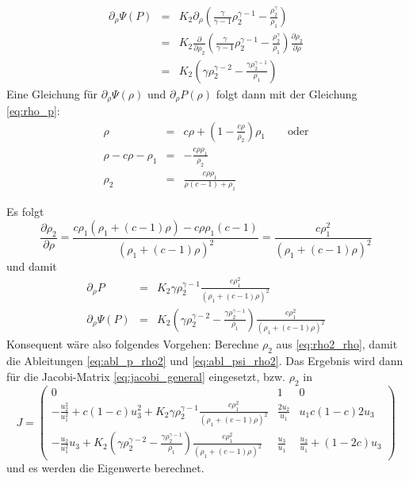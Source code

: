 \begin{eqnarray*}
  \partial_{\rho} \Psi(P) &=& K_2 \partial_{\rho}
\left(\frac{\gamma}{\gamma-1} \rho_2^{\gamma-1} -
\frac{\rho_2^{\gamma}}{\rho_1}\right)\\
 &=& K_2 \frac{\partial}{\partial \rho_2}\left(\frac{\gamma}{\gamma-1}
\rho_2^{\gamma-1} -
\frac{\rho_2^{\gamma}}{\rho_1}\right)\frac{\partial\rho_2}{\partial
  \rho}\\
 &=& K_2 \left(\gamma\rho_2^{\gamma-2} -
\frac{\gamma\rho_2^{\gamma-1}}{\rho_1}\right)
\end{eqnarray*}
Eine Gleichung für $\partial_{\rho} \Psi(\rho)$ und
$\partial_{\rho} P(\rho)$ folgt dann mit der Gleichung \ref{eq:rho_p}:
\begin{eqnarray}
\rho  &=& c \rho + (1-\frac{c \rho }{\rho_2})\rho_1\qquad \mbox{oder}\nonumber \\
\rho - c \rho - \rho_1 &=& -\frac{c \rho\rho_1}{\rho_2}\nonumber \\
\rho_2 &=& \frac{c\rho \rho_1}{\rho (c-1) + \rho_1}\label{eq:rho2_rho}
\end{eqnarray}

Es folgt
\begin{equation}
\frac{\partial\rho_2}{\partial \rho} =
\frac{c\rho_1(\rho_1 + (c - 1)\rho)  - c\rho \rho_1(c - 1)}
     {(\rho_1 + (c - 1)\rho)^2}
=
     \frac{c\rho_1^2}
     {(\rho_1 + (c - 1)\rho)^2}
     \label{eq:abl_rho2_rho}
\end{equation}
und damit
\begin{eqnarray}
  \partial_{\rho} P &=&  K_2 \gamma \rho_2^{\gamma-1} \frac{c\rho_1^2}
     {(\rho_1 + (c - 1)\rho)^2}
  \label{eq:abl_p_rho2}\\
%
\partial_{\rho} \Psi(P) &=& K_2 
\left(\gamma\rho_2^{\gamma-2} -
\frac{\gamma\rho_2^{\gamma-1}}{\rho_1}\right)\frac{c\rho_1^2}
     {(\rho_1 + (c - 1)\rho)^2}
\label{eq:abl_psi_rho2}
\end{eqnarray}
Konsequent wäre also folgendes Vorgehen: Berechne $\rho_2$ aus
\ref{eq:rho2_rho}, damit die Ableitungen \ref{eq:abl_p_rho2} und
\ref{eq:abl_psi_rho2}. Das Ergebnis wird dann für die Jacobi-Matrix
\ref{eq:jacobi_general} eingesetzt, bzw. $\rho_2$ in
\begin{equation}
J = \left(\begin{array}{ccc}
0 & 1 & 0\\[3mm]
- \frac{u_2^2}{u_1^2} + c (1-c) u_3^2  + 
K_2 \gamma \rho_2^{\gamma-1} \frac{c\rho_1^2}
{(\rho_1 + (c - 1)\rho)^2}
& \frac{2 u_2}{u_1}  &  u_1 c (1-c) 2 u_3  \\[3mm]
- \frac{u_2}{u_1^2} u_3 + K_2 
\left(\gamma\rho_2^{\gamma-2} -
  \frac{\gamma\rho_2^{\gamma-1}}{\rho_1}\right)\frac{c\rho_1^2}
{(\rho_1 + (c - 1)\rho)^2}
&   \frac{u_3}{u_1}  &  
\frac{u_2}{u_1} + (1-2c) u_3 
\end{array}\right)\label{eq:jacobi_v2}
\end{equation}
und es werden die Eigenwerte berechnet.

